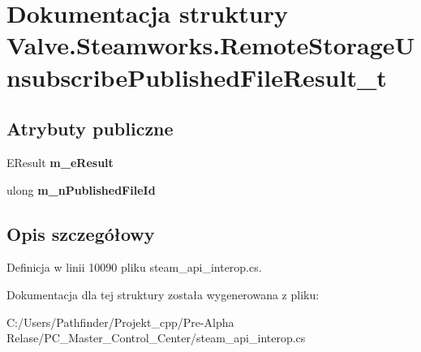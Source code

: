 \hypertarget{struct_valve_1_1_steamworks_1_1_remote_storage_unsubscribe_published_file_result__t}{}\section{Dokumentacja struktury Valve.\+Steamworks.\+Remote\+Storage\+Unsubscribe\+Published\+File\+Result\+\_\+t}
\label{struct_valve_1_1_steamworks_1_1_remote_storage_unsubscribe_published_file_result__t}
\subsection*{Atrybuty publiczne}
\begin{DoxyCompactItemize}
\item 
\mbox{\label{struct_valve_1_1_steamworks_1_1_remote_storage_unsubscribe_published_file_result__t_ab12beec25bc071bb6ae9b4d4da062b4b}} 
E\+Result {\bfseries m\+\_\+e\+Result}
\item 
\mbox{\label{struct_valve_1_1_steamworks_1_1_remote_storage_unsubscribe_published_file_result__t_af3e4e1c632a59530f79bf1f71f3152eb}} 
ulong {\bfseries m\+\_\+n\+Published\+File\+Id}
\end{DoxyCompactItemize}


\subsection{Opis szczegółowy}


Definicja w linii 10090 pliku steam\+\_\+api\+\_\+interop.\+cs.



Dokumentacja dla tej struktury została wygenerowana z pliku\+:\begin{DoxyCompactItemize}
\item 
C\+:/\+Users/\+Pathfinder/\+Projekt\+\_\+cpp/\+Pre-\/\+Alpha Relase/\+P\+C\+\_\+\+Master\+\_\+\+Control\+\_\+\+Center/steam\+\_\+api\+\_\+interop.\+cs\end{DoxyCompactItemize}
